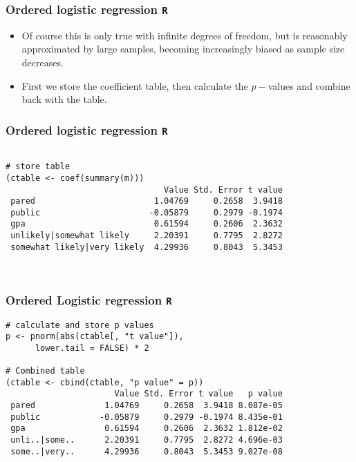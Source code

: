 \documentclass[00-GLMregslides.tex]{subfiles}
\begin{document}
\begin{frame}[fragile]
	\frametitle{Ordered logistic regression \texttt{R} }
	\Large
\begin{itemize}
\item Of course this is only true with infinite degrees of freedom, but is reasonably approximated by large 
samples, becoming increasingly biased as sample size decreases. 
\item First we store the coefficient table, then calculate the $p-$values and combine back with the table.
\end{itemize}
\end{frame}
\begin{frame}[fragile]
	\frametitle{Ordered logistic regression \texttt{R} }
\normalsize
	
	\begin{verbatim}
		
# store table
(ctable <- coef(summary(m)))
                                Value Std. Error t value
 pared                        1.04769     0.2658  3.9418
 public                      -0.05879     0.2979 -0.1974
 gpa                          0.61594     0.2606  2.3632
 unlikely|somewhat likely     2.20391     0.7795  2.8272
 somewhat likely|very likely  4.29936     0.8043  5.3453
 
 

\end{verbatim}

\end{frame}
\begin{frame}[fragile]
	\frametitle{Ordered Logistic regression \texttt{R} }
\normalsize	
	\begin{verbatim}
# calculate and store p values
p <- pnorm(abs(ctable[, "t value"]), 
      lower.tail = FALSE) * 2

# Combined table
(ctable <- cbind(ctable, "p value" = p))
                      Value Std. Error t value   p value
 pared              1.04769     0.2658  3.9418 8.087e-05
 public            -0.05879     0.2979 -0.1974 8.435e-01
 gpa                0.61594     0.2606  2.3632 1.812e-02
 unli..|some..      2.20391     0.7795  2.8272 4.696e-03
 some..|very..      4.29936     0.8043  5.3453 9.027e-08
\end{verbatim}

\end{frame} 

\end{document}
